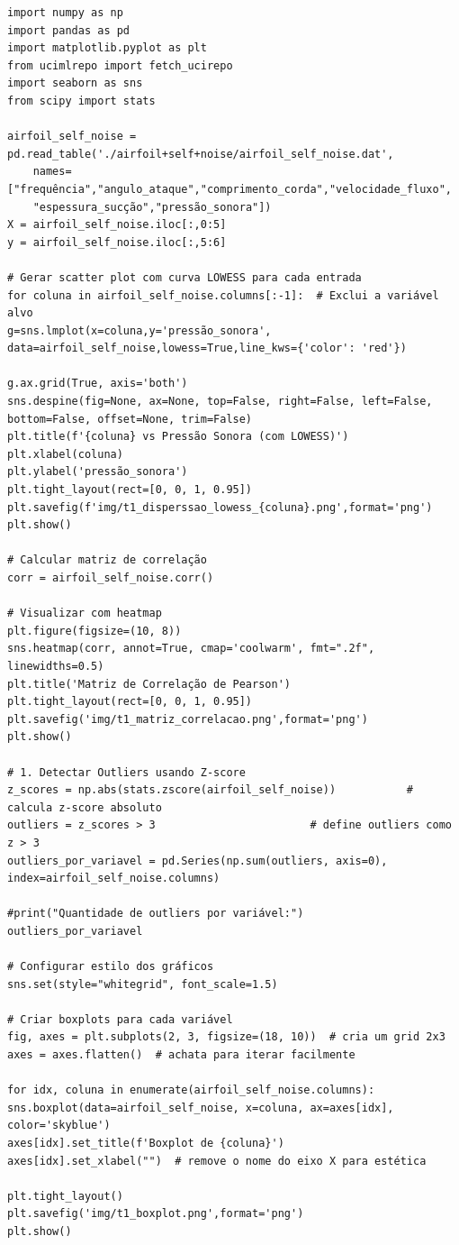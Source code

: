 \documentclass[12pt,a4paper,oneside]{report}
\begin{document}
\begin{lstlisting}[caption={Analise dos dados}, label={lst:analise_dados}]
import numpy as np
import pandas as pd
import matplotlib.pyplot as plt
from ucimlrepo import fetch_ucirepo 
import seaborn as sns
from scipy import stats

airfoil_self_noise = pd.read_table('./airfoil+self+noise/airfoil_self_noise.dat',
	names=["frequência","angulo_ataque","comprimento_corda","velocidade_fluxo",
	"espessura_sucção","pressão_sonora"])
X = airfoil_self_noise.iloc[:,0:5]
y = airfoil_self_noise.iloc[:,5:6]

# Gerar scatter plot com curva LOWESS para cada entrada
for coluna in airfoil_self_noise.columns[:-1]:  # Exclui a variável alvo
g=sns.lmplot(x=coluna,y='pressão_sonora',
data=airfoil_self_noise,lowess=True,line_kws={'color': 'red'})

g.ax.grid(True, axis='both')
sns.despine(fig=None, ax=None, top=False, right=False, left=False, bottom=False, offset=None, trim=False)
plt.title(f'{coluna} vs Pressão Sonora (com LOWESS)')
plt.xlabel(coluna)
plt.ylabel('pressão_sonora')
plt.tight_layout(rect=[0, 0, 1, 0.95])
plt.savefig(f'img/t1_disperssao_lowess_{coluna}.png',format='png')
plt.show()

# Calcular matriz de correlação
corr = airfoil_self_noise.corr()

# Visualizar com heatmap
plt.figure(figsize=(10, 8))
sns.heatmap(corr, annot=True, cmap='coolwarm', fmt=".2f", linewidths=0.5)
plt.title('Matriz de Correlação de Pearson')
plt.tight_layout(rect=[0, 0, 1, 0.95])
plt.savefig('img/t1_matriz_correlacao.png',format='png')
plt.show()

# 1. Detectar Outliers usando Z-score
z_scores = np.abs(stats.zscore(airfoil_self_noise))           # calcula z-score absoluto
outliers = z_scores > 3                        # define outliers como z > 3
outliers_por_variavel = pd.Series(np.sum(outliers, axis=0), index=airfoil_self_noise.columns)

#print("Quantidade de outliers por variável:")
outliers_por_variavel

# Configurar estilo dos gráficos
sns.set(style="whitegrid", font_scale=1.5)

# Criar boxplots para cada variável
fig, axes = plt.subplots(2, 3, figsize=(18, 10))  # cria um grid 2x3
axes = axes.flatten()  # achata para iterar facilmente

for idx, coluna in enumerate(airfoil_self_noise.columns):
sns.boxplot(data=airfoil_self_noise, x=coluna, ax=axes[idx], color='skyblue')
axes[idx].set_title(f'Boxplot de {coluna}')
axes[idx].set_xlabel("")  # remove o nome do eixo X para estética

plt.tight_layout()
plt.savefig('img/t1_boxplot.png',format='png')
plt.show()
\end{lstlisting}
\end{document}
